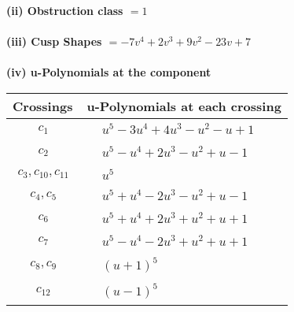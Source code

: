 \documentclass[1p]{elsarticle_modified}
\theoremstyle{definition}
\begin{document}
\flushleft \textbf{(ii) Obstruction class $= 1$}\\~\\
\flushleft \textbf{(iii) Cusp Shapes $= -7 v^4+2 v^3+9 v^2-23 v+7$}\\~\\
\newpage\renewcommand{\arraystretch}{1}
\flushleft \textbf{(iv) u-Polynomials at the component}\newline \\
\begin{tabular}{m{50pt}|m{274pt}}
Crossings & \hspace{64pt}u-Polynomials at each crossing \\
\hline $$\begin{aligned}c_{1}\end{aligned}$$&$\begin{aligned}
&u^5-3 u^4+4 u^3- u^2- u+1
\end{aligned}$\\
\hline $$\begin{aligned}c_{2}\end{aligned}$$&$\begin{aligned}
&u^5- u^4+2 u^3- u^2+u-1
\end{aligned}$\\
\hline $$\begin{aligned}c_{3},c_{10},c_{11}\end{aligned}$$&$\begin{aligned}
&u^5
\end{aligned}$\\
\hline $$\begin{aligned}c_{4},c_{5}\end{aligned}$$&$\begin{aligned}
&u^5+u^4-2 u^3- u^2+u-1
\end{aligned}$\\
\hline $$\begin{aligned}c_{6}\end{aligned}$$&$\begin{aligned}
&u^5+u^4+2 u^3+u^2+u+1
\end{aligned}$\\
\hline $$\begin{aligned}c_{7}\end{aligned}$$&$\begin{aligned}
&u^5- u^4-2 u^3+u^2+u+1
\end{aligned}$\\
\hline $$\begin{aligned}c_{8},c_{9}\end{aligned}$$&$\begin{aligned}
&(u+1)^5
\end{aligned}$\\
\hline $$\begin{aligned}c_{12}\end{aligned}$$&$\begin{aligned}
&(u-1)^5
\end{aligned}$\\
\hline
\end{tabular}\\~\\
\end{document}

